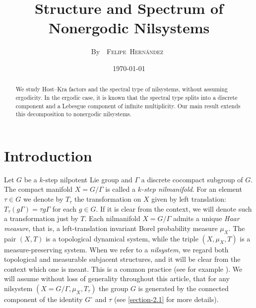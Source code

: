 \documentclass[letter, 11pt]{article}
\theoremstyle{definition}
\theoremstyle{plain}
\newcommand{\1}{\mathbbm{1}}
\begin{document}
\author{By~~{\scshape Felipe~Hernández~}}
\date{\small \today}
\title{{\bfseries Structure and Spectrum of Nonergodic Nilsystems}}
\maketitle


\begin{abstract}
We study Host–Kra factors and the spectral type of nilsystems, without assuming ergodicity.
In the ergodic case, it is known that the spectral type splits into a discrete component and a Lebesgue component of infinite multiplicity.
Our main result extends this decomposition to nonergodic nilsystems.
\end{abstract}
\section{Introduction} 
 Let $G$ be a $k$-step nilpotent Lie group and $\Gamma$ a discrete cocompact subgroup of $G$. The compact manifold $X=G/\Gamma$ is called a \textit{$k$-step nilmanifold}. For an element $\tau \in G$ we denote by $T_\tau$ the transformation on $X$ given by left translation: $T_\tau(g\Gamma)=\tau g\Gamma$ for each $g\in G$. If it is clear from the context, we will denote such a transformation just by $T$. Each nilmanifold $X=G/\Gamma$ admits a unique \textit{Haar measure}, that is, a left-translation invariant Borel probability measure $\mu_X$. The pair $(X,T)$ is a topological dynamical system, while the triple $(X,\mu_X,T)$ is a measure-preserving system. When we refer to a \textit{nilsystem}, we regard both topological and measurable subjacent structures, and it will be clear from the context which one is meant. This is a common practice (see for example \cite[Chapter 11]{Host_Kra_nilpotent_structures_ergodic_theory:2018}). We will assume without loss of generality throughout this article, that for any nilsystem $(X=G/\Gamma,\mu_X,T_\tau)$ the group $G$ is generated by the connected component of the identity $G^\circ$ and $\tau$ (see \cref{section-2.1} for more details). 
 
\end{document}
